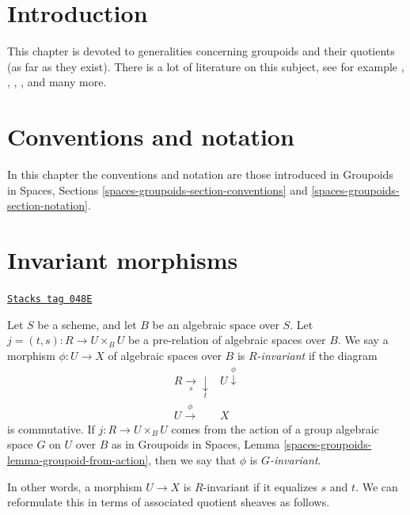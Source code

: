 \section{Introduction}
\label{groupoids-quotients-section-introduction}
This chapter is devoted to generalities concerning groupoids and their
quotients (as far as they exist).
There is a lot of literature on this subject, see for example
\cite{GIT}, \cite{seshadri_quotients}, \cite{KollarQuotients},
\cite{K-M}, \cite{KollarFinite} and many more.

\section{Conventions and notation}
\label{groupoids-quotients-section-conventions-notation}
In this chapter the conventions and notation are those introduced in
Groupoids in Spaces, Sections \ref{spaces-groupoids-section-conventions}
and \ref{spaces-groupoids-section-notation}.

\section{Invariant morphisms}
\label{groupoids-quotients-section-invariant}
\begin{definition}[Invariant]
\label{groupoids-quotients-definition-invariant}
\href{https://stacks.math.columbia.edu/tag/048E}{\texttt{Stacks tag 048E}}

Let $S$ be a scheme, and let $B$ be an algebraic space over $S$.
Let $j = (t, s) : R \to U \times_B U$ be a pre-relation of algebraic
spaces over $B$. We say a morphism $\phi : U \to X$ of algebraic spaces
over $B$ is {\it $R$-invariant} if the diagram
$$
\begin{array}{cc}R \underset{s}{\longrightarrow}\underset{t}{\downarrow} & U \overset{\phi}{\downarrow} \\ U \overset{\phi}{\longrightarrow} & X\end{array}
$$
is commutative. If $j : R \to U \times_B U$ comes from the action
of a group algebraic space $G$ on $U$ over $B$ as in
Groupoids in Spaces, Lemma \ref{spaces-groupoids-lemma-groupoid-from-action},
then we say that $\phi$ is {\it $G$-invariant}.
\end{definition}

In other words, a morphism $U \to X$ is $R$-invariant if it equalizes
$s$ and $t$.  We can reformulate this in terms of associated quotient
sheaves as follows.

